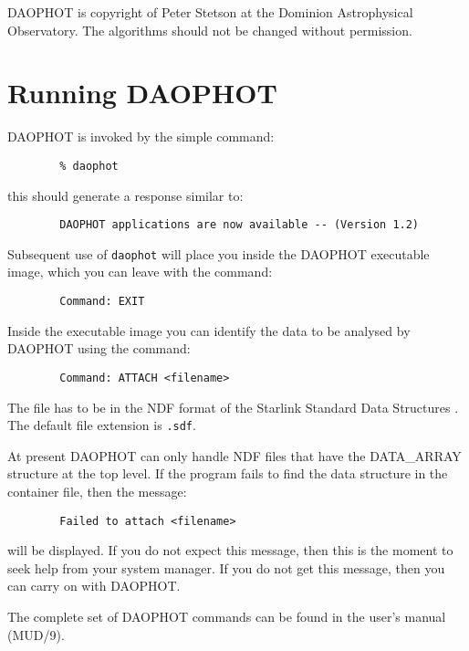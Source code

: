 DAOPHOT is copyright of Peter Stetson at the Dominion Astrophysical Observatory.
The algorithms should not be changed without permission. 


\section{Running DAOPHOT}

\label{sec:running}

DAOPHOT is invoked by the simple command:

\begin{verbatim}
        % daophot
\end{verbatim}

this should generate a response similar to: 

\begin{verbatim}
        DAOPHOT applications are now available -- (Version 1.2)
\end{verbatim}

Subsequent use of {\tt daophot} will place you inside the DAOPHOT executable image,
which you can leave with the command: 

\begin{verbatim}
        Command: EXIT
\end{verbatim}

Inside the executable image you can identify the data to be analysed by DAOPHOT
using the command:

\begin{verbatim}
        Command: ATTACH <filename>
\end{verbatim}

The file has to be in the NDF format of the Starlink Standard Data Structures
. The default file extension is {\tt .sdf}. 

At present DAOPHOT can only handle NDF files that have the DATA\_ARRAY structure at
the top level. If the program fails to find the data structure in the container
file, then the message:

\begin{verbatim}
        Failed to attach <filename>
\end{verbatim}

will be displayed. If you do not expect this message, then this is the moment to
seek help from your system manager. If you do not get this message, then you can
carry on with DAOPHOT. 

The complete set of DAOPHOT commands can be found in the user's manual (MUD/9).

